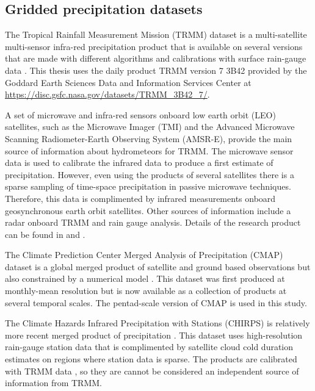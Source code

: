 \subsection{Gridded precipitation datasets}

The Tropical Rainfall Measurement Mission (TRMM) dataset is a multi-satellite multi-sensor infra-red precipitation product that is available on several versions that are made with different algorithms and calibrations with surface rain-gauge data \citep{huffman2007}. This thesis uses the daily product TRMM version 7 3B42 provided by the Goddard Earth Sciences Data and Information Services Center \citep{mission2011trmm} at \url{https://disc.gsfc.nasa.gov/datasets/TRMM_3B42_7/}.

 A set of microwave and infra-red sensors onboard low earth orbit (LEO) satellites, such as the Microwave Imager (TMI) and the Advanced Microwave Scanning Radiometer-Earth Observing System (AMSR-E), provide the main source of information about hydrometeors for TRMM. The microwave sensor data is used to calibrate the infrared data to produce a first estimate of precipitation. However, even using the products of several satellites there is a sparse sampling of time-space precipitation  in passive microwave techniques. Therefore, this data is complimented by infrared measurements onboard geosynchronous earth orbit satellites. Other sources of information include a radar onboard TRMM and rain gauge analysis. Details of the research product can be found in \cite{huffman2007} and \cite{mission2011}.

The Climate Prediction Center Merged Analysis of Precipitation (CMAP) dataset is a global merged product of satellite and ground based observations but also constrained by a numerical model \citep{Xie2007}. This dataset was first produced at monthly-mean resolution \citep{xie1997} but is now available as a collection of products at several temporal scales. The pentad-scale version of CMAP is used in this study. %

The Climate Hazards Infrared Precipitation with Stations (CHIRPS) is relatively more recent merged product of precipitation \citep{funk2015}. This dataset uses high-resolution rain-gauge station data that is complimented by satellite cloud cold duration estimates on regions where station data is sparse. The products are calibrated with TRMM data \citep{funk2015}, so they are cannot be considered an independent source of information from TRMM.




